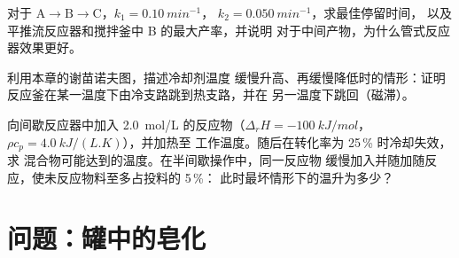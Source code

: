 \begin{exercise}[$\star\star\star$]\label{exo:b2:continuous-reactors:10}
对于 $\mathrm A \to \mathrm B \to \mathrm C$，$k_1 = \qty{0.10}{min^{-1}}$，
$k_2 = \qty{0.050}{min^{-1}}$，求最佳停留时间，
以及平推流反应器和搅拌釜中 B 的最大产率，并说明
对于中间产物，为什么管式反应器效果更好。
\end{exercise}

\begin{exercise}[$\star\star\star$]\label{exo:b2:continuous-reactors:11}
利用本章的谢苗诺夫图，描述冷却剂温度
缓慢升高、再缓慢降低时的情形：证明
反应釜在某一温度下由冷支路跳到热支路，并在
另一温度下跳回（磁滞）。
\end{exercise}

\begin{exercise}[$\star\star\star$]\label{exo:b2:continuous-reactors:12}
向间歇反应器中加入 \qty{2.0}{mol/L} 的反应物（$\Delta_r H =
\qty{-100}{kJ/mol}$，$\rho c_p = \qty{4.0}{kJ/(L.K)}$），并加热至
工作温度。随后在转化率为 25\,\% 时冷却失效，求
混合物可能达到的温度。在半间歇操作中，同一反应物
缓慢加入并随加随反应，使未反应物料至多占投料的 5\,\%：
此时最坏情形下的温升为多少？
\end{exercise}

\section{问题：罐中的皂化}

